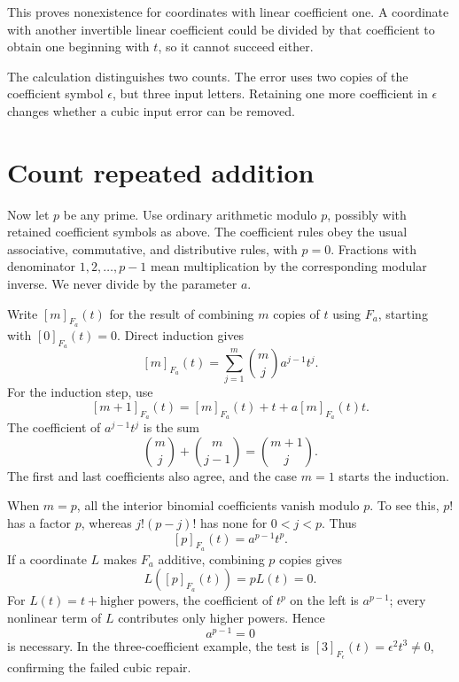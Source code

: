 This proves nonexistence for coordinates with linear coefficient one. A coordinate with another invertible linear coefficient could be divided by that coefficient to obtain one beginning with \(t\), so it cannot succeed either.

The calculation distinguishes two counts. The error uses two copies of the coefficient symbol \(\epsilon\), but three input letters. Retaining one more coefficient in \(\epsilon\) changes whether a cubic input error can be removed.

\section{Count repeated addition}\label{sec:repeated}

Now let \(p\) be any prime. Use ordinary arithmetic modulo \(p\), possibly with retained coefficient symbols as above. The coefficient rules obey the usual associative, commutative, and distributive rules, with \(p=0\). Fractions with denominator \(1,2,\ldots,p-1\) mean multiplication by the corresponding modular inverse. We never divide by the parameter \(a\).

Write \([m]_{F_a}(t)\) for the result of combining \(m\) copies of \(t\) using \(F_a\), starting with \([0]_{F_a}(t)=0\). Direct induction gives
\begin{equation}\label{eq:m-series}
 [m]_{F_a}(t)=\sum_{j=1}^{m}\binom mj a^{j-1}t^j.
\end{equation}
For the induction step, use
\[
 [m+1]_{F_a}(t)=[m]_{F_a}(t)+t+a[m]_{F_a}(t)t.
\]
The coefficient of \(a^{j-1}t^j\) is the sum
\[
 \binom mj+\binom m{j-1}=\binom{m+1}j.
\]
The first and last coefficients also agree, and the case \(m=1\) starts the induction.

When \(m=p\), all the interior binomial coefficients vanish modulo \(p\). To see this, \(p!\) has a factor \(p\), whereas \(j!(p-j)!\) has none for \(0<j<p\). Thus
\begin{equation}\label{eq:p-series}
 \boxed{\;[p]_{F_a}(t)=a^{p-1}t^p.\;}
\end{equation}
If a coordinate \(L\) makes \(F_a\) additive, combining \(p\) copies gives
\[
 L([p]_{F_a}(t))=pL(t)=0.
\]
For \(L(t)=t+\text{higher powers}\), the coefficient of \(t^p\) on the left is \(a^{p-1}\); every nonlinear term of \(L\) contributes only higher powers. Hence
\begin{equation}\label{eq:necessary}
 a^{p-1}=0
\end{equation}
is necessary. In the three-coefficient example, the test is \([3]_{F_\epsilon}(t)=\epsilon^2t^3\ne0\), confirming the failed cubic repair.


